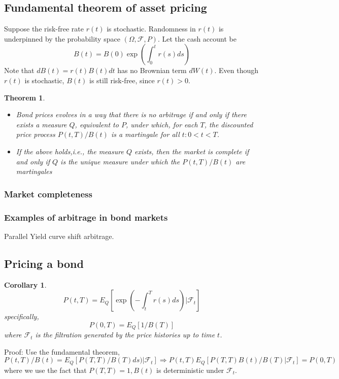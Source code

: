 \documentclass[a4paper,13pt]{report}
\newcommand{\cF}{\mathcal{F}}
\newtheorem{theorem}{Theorem}[section]
\newtheorem{corollary}{Corollary}[theorem]
\begin{document}
\subsection{Fundamental theorem of asset pricing}
Suppose the risk-free rate $r(t)$ is stochastic. Randomness in $r(t)$ is underpinned by the probability space $(\Omega,\cF,P)$. Let the cash account be $$B(t) = B(0) \exp(\int_0^t r(s)ds)$$
Note that $dB(t) = r(t)B(t)dt$ has no Brownian term $dW(t)$. Even though $r(t)$ is stochastic, $B(t)$ is still risk-free, since $r(t) > 0$.

\begin{theorem}
\begin{itemize}
    \item Bond prices evolves in a way that there is no arbitrage if and only if there exists a measure $Q$, equivalent to $P$, under which, for each $T$, the discounted price process $P(t,T)/B(t)$ is a martingale for all $t: 0 < t< T$.
    \item If the above holds,i.e., the measure $Q$ exists, then the market is complete if and only if $Q$ is the unique measure under which the $P(t,T)/B(t)$ are martingales
\end{itemize}
\end{theorem}




\subsubsection{Market completeness}

\subsubsection{Examples of arbitrage in bond markets}
Parallel Yield curve shift arbitrage.\cite{cairns2004interest}

\subsection{Pricing a bond}
\begin{corollary}
$$P(t,T) = E_Q[\exp(-\int_t^T r(s)ds)|\cF_t]$$
specifically, 
$$P(0,T) = E_Q[1/B(T)]$$
where $\cF_t$ is the filtration generated by the price histories up to time $t$. 
\end{corollary}
Proof: Use the fundamental theorem, $$P(t,T)/B(t) =E_Q[P(T,T)/B(T)ds)|\cF_t] \Rightarrow  P(t,T)E_Q[P(T,T)B(t)/B(T)|\cF_t ]=P(0,T)$$
where we use the fact that $P(T,T)=1,B(t)$ is deterministic under $\cF_t$.
\end{document}
